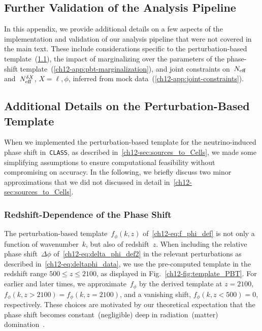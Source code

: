 \begin{subappendices}


\section{Further Validation of the Analysis Pipeline}
\label{ch12-app:validation}

In this appendix, we provide additional details on a few aspects of the implementation and validation of our analysis pipeline that were not covered in the main text. These include considerations specific to the perturbation-based template~(\textsection\ref{ch12-app:pbt-details}), the impact of marginalizing over the parameters of the phase-shift template~(\textsection\ref{ch12-app:pbt-marginalization}), and joint constraints on~$N_\mathrm{eff}$ and~$N_\mathrm{eff}^{\delta X}$, $X = \ell, \phi$, inferred from mock data~(\textsection\ref{ch12-app:joint-constraints}).


\subsection{Additional Details on the Perturbation-Based Template}
\label{ch12-app:pbt-details}

When we implemented the perturbation-based template for the neutrino-induced phase shift in~\texttt{CLASS}, as described in~\textsection\ref{ch12-sec:sources_to_Cells}, we made some simplifying assumptions to ensure computational feasibility without compromising on accuracy. In the following, we briefly discuss two minor approximations that we did not discussed in detail in~\textsection\ref{ch12-sec:sources_to_Cells}.


\subsubsection*{Redshift-Dependence of the Phase Shift}

The perturbation-based template~$f_\phi(k, z)$ of~\eqref{ch12-eq:f_phi_def} is not only a function of wavenumber~$k$, but also of redshift~$z$. When including the relative phase shift~$\Delta\phi$ of~\eqref{ch12-eq:delta_phi_def2} in the relevant perturbations as described in~\eqref{ch12-eq:deltaphi_data}, we use the pre-computed template in the redshift range $500 \leq z \leq 2100$, as displayed in Fig.~\ref{ch12-fig:template_PBT}. For earlier and later times, we approximate~$f_\phi$ by the derived template at $z = 2100$, $f_\phi(k, z > 2100) = f_\phi(k, z = 2100)$, and a vanishing shift, $f_\phi(k, z < 500) = 0$, respectively. These choices are motivated by our theoretical expectation that the phase shift becomes constant~(negligible) deep in radiation~(matter) domination~\cite{Baumann:2015rya}.


\end{subappendices}
